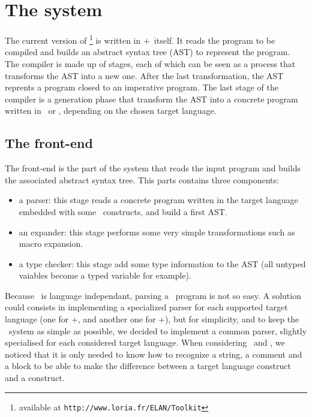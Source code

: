 \section{The system}

The current version of \TOM\footnote{available at
  \texttt{http://www.loria.fr/ELAN/Toolkit}} is written in
\Java+\TOM\ itself. 
It reads the program to be compiled and builds an abstract syntax tree
(AST) to represent the program.
The compiler is made up of stages, each of which can be seen as a
process that transforms the AST into a new one. After the last transformation,
the AST reprents a program closed to an imperative program.
The last stage of the compiler is a generation phase that transform
the AST into a concrete program written in \C\ or \Java, depending 
on the chosen target language.


\subsection{The front-end}
The front-end is the part of the system that reads the input program
and builds the associated abstract syntax tree.
This parts contains three components:
\begin{itemize}
\item a parser: this stage reads a concrete program written in the
  target language embedded with some \TOM\ constructs, and build a
  first AST.
\item an expander: this stage performs some very simple
  transformations such as macro expansion.
\item a type checker: this stage add some type information to the AST
  (all untyped vaiables become a typed variable for example).
\end{itemize}

Because \TOM\ is language independant, parsing a \TOM\ program is not
so easy. A solution could consists in implementing a specialized
parser for each supported target language (one for \C+\TOM, and
another one for \Java+\TOM), but for simplicity, and to keep the \TOM\
system as simple as possible, we decided to implement a common parser,
slightly specialised for each considered target language. 
When considering \C\ and \Java, we noticed that it is only needed to
know how to recognize a string, a comment and a block to be able to
make the difference between a target language construct and a \TOM
construct.

